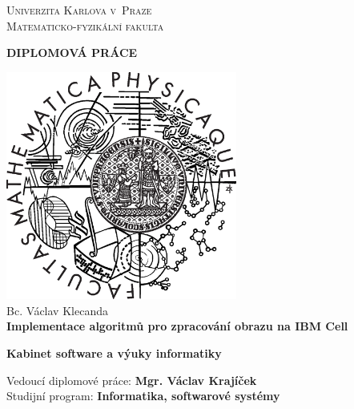 \begin{center}


\large
\textsc{
Univerzita Karlova v~Praze\\
Matematicko-fyzikální fakulta\\[1.2cm]
}


\Huge
\textbf{
DIPLOMOVÁ PRÁCE\\[1.5cm]
}


\includegraphics[height=7.5cm]{data/logo.eps}\\[2cm]


\Large
Bc. Václav Klecanda\\[1cm]

\LARGE
\textbf{
Implementace algoritmů pro zpracování obrazu na IBM Cell\\[1cm]
}


\large
\textbf{
Kabinet software a výuky informatiky\\
}

Vedoucí diplomové práce: \textbf{Mgr. Václav Krajíček}\\

Studijní program: \textbf{Informatika, softwarové systémy}

\end{center}

\pagebreak
 
